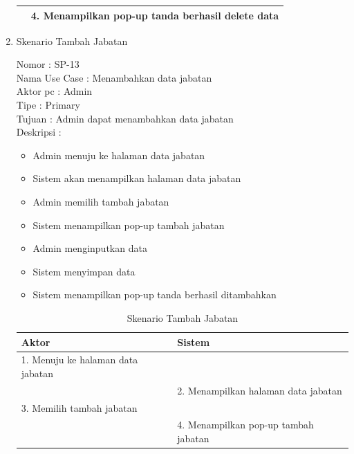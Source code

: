 \begin{enumerate}
\begin{table}
\begin{tabular}{ | p{55mm} | p{70mm} |}
		\hline
		
		& 4.	Menampilkan pop-up tanda berhasil delete data \\
		\hline
		
	\end{tabular}
\end{table}

\newpage
\item Skenario Tambah Jabatan

Nomor \kern 3.6pc : SP-13 \\
Nama Use Case : Menambahkan data jabatan \\
Aktor  pc : Admin \\
Tipe \kern 4.6pc : Primary \\
Tujuan \kern 3.6pc : Admin dapat menambahkan data jabatan \\
Deskripsi \kern 2.5pc : 

\begin{itemize}
	\item Admin menuju ke halaman data jabatan
	\item Sistem akan menampilkan halaman data jabatan
	\item Admin memilih tambah jabatan
	\item Sistem menampilkan pop-up tambah jabatan
	\item Admin menginputkan data
	\item Sistem menyimpan data
	\item Sistem menampilkan pop-up tanda berhasil ditambahkan
	
\end{itemize}

\begin{table}
	\caption{Skenario Tambah Jabatan}
	\centering
	\begin{tabular}{ | l | p{65mm} |}
		\hline 
		\textbf{Aktor} & \textbf{Sistem} \\
		\hline
		
		1.	Menuju ke halaman data jabatan &  \\
		
		\hline
		
		&  2.	Menampilkan halaman data jabatan \\
		
		\hline
		
		3. Memilih tambah jabatan & \\
		
		\hline
		
		& 4.	Menampilkan pop-up tambah jabatan \\
		

\end{tabular}
\end{table}
\end{enumerate}

